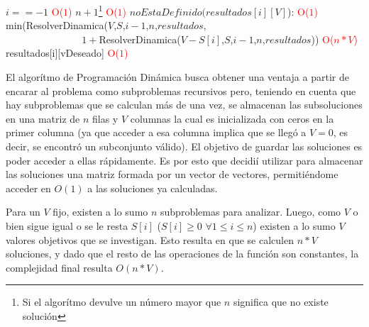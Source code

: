 \begin{codebox}
    \li \If $i == -1$  \textcolor{red}{O($1$)}
        \Then
    \li                 \Return $n+1$\footnote{\label{bktrk}Si el algor\'itmo devulve un n\'umero mayor que $n$ significa que no existe soluci\'on} \textcolor{red}{O($1$)}
                \End
    \li \If $noEstaDefinido(resultados[i][V]$):  \textcolor{red}{O($1$)}
        \Then 
    \li          \Return min(ResolverDinamica($V$,$S$,$i-1$,$n$,$resultados$,
                            \\ $\qquad\qquad$$\qquad\quad\,\,$ $1+$ResolverDinamica($V-S[i]$,$S$,$i-1$,$n$,$resultados$)) \textcolor{red}{O($n*V$)}
                            \End
    \li \Return resultados[i][vDeseado]  \textcolor{red}{O($1$)}
    \end{codebox}
\par El algor\'itmo de Programaci\'on Din\'amica busca obtener una ventaja a partir de encarar al problema como
subproblemas recursivos pero, teniendo en cuenta que hay subproblemas que se calculan m\'as de una vez, se 
almacenan las subsoluciones  en una matriz de $n$ filas y $V$ columnas la cual es inicializada con ceros en
la primer columna (ya que acceder a esa columna implica que se lleg\'o a $V=0$, es decir, se encontr\'o un subconjunto v\'alido).
 El objetivo de guardar las soluciones es poder acceder a ellas
r\'apidamente. Es por esto que decidi\'i utilizar para almacenar las soluciones una matriz formada por un vector de 
vectores, permiti\'endome acceder en $O(1)$ a las soluciones ya calculadas.
\par Para un $V$ fijo, existen a lo sumo $n$ subproblemas para analizar. Luego, como $V$ o bien sigue igual o se le resta $S[i]$ ($S[i]\geq 0$ $\forall 1\leq i \leq n$)
existen a lo sumo $V$ valores objetivos que se investigan. Esto resulta en que se calculen $n*V$ soluciones, y dado que el resto de las operaciones de 
la funci\'on son constantes, la complejidad final resulta $O(n*V)$.
